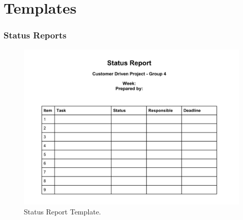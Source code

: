  

\chapter{Templates}

\subsection{Status Reports}
\begin{figure}[htbp]
\begin{center}
\includegraphics[width = \textwidth]{Appendix/statusreportTemp.jpg}
\caption{Status Report Template.}
\label{StatusReportTemplate}
\end{center}
\end{figure}

